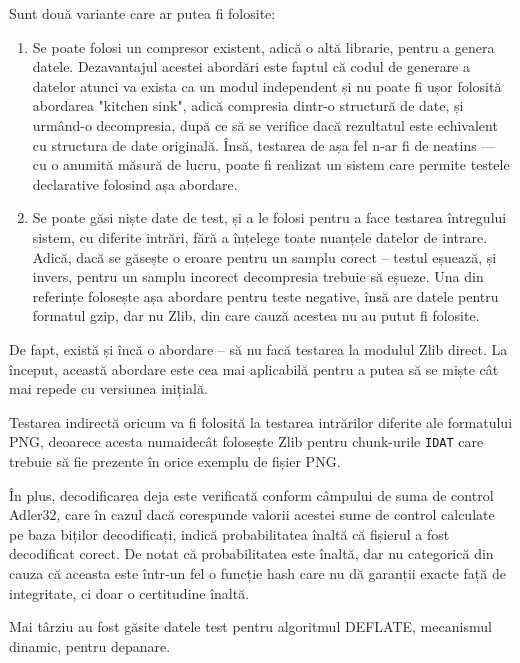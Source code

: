 \documentclass[a4paper,12pt]{report}
\begin{document}
Sunt două variante care ar putea fi folosite:
\begin{enumerate}
    \item
        Se poate folosi un compresor existent, adică o altă librarie, pentru a genera datele.
        Dezavantajul acestei abordări este faptul că codul de generare a datelor atunci va exista
        ca un modul independent și nu poate fi ușor folosită abordarea "kitchen sink", adică
        compresia dintr-o structură de date, și urmând-o decompresia, după ce să se verifice
        dacă rezultatul este echivalent cu structura de date originală.
        Însă, testarea de așa fel n-ar fi de neatins --- cu o anumită măsură de lucru,
        poate fi realizat un sistem care permite testele declarative folosind așa abordare.
    \item
        Se poate găsi niște date de test, și a le folosi pentru a face testarea
        întregului sistem, cu diferite intrări, fără a înțelege toate nuanțele datelor de intrare.
        Adică, dacă se găsește o eroare pentru un samplu corect -- testul eșuează,
        și invers, pentru un samplu incorect decompresia trebuie să eșueze.
        Una din referințe \cite{gzip_impl} folosește așa abordare pentru teste negative,
        însă are datele pentru formatul gzip, dar nu Zlib, din care cauză acestea nu au putut fi folosite.
\end{enumerate}

De fapt, există și încă o abordare -- să nu facă testarea la modulul Zlib direct.
La început, această abordare este cea mai aplicabilă pentru a putea să se miște cât mai repede cu versiunea inițială.

Testarea indirectă oricum va fi folosită la testarea intrărilor diferite ale formatului \ac{PNG},
deoarece acesta numaidecât folosește Zlib pentru chunk-urile \texttt{IDAT} care trebuie să fie prezente
în orice exemplu de fișier \ac{PNG}.

În plus, decodificarea deja este verificată conform câmpului de suma de control Adler32,
care în cazul dacă corespunde valorii acestei sume de control calculate pe baza biților decodificați,
indică probabilitatea înaltă că fișierul a fost decodificat corect. 
De notat că probabilitatea este înaltă, dar nu categorică din cauza
că aceasta este într-un fel o funcție hash care nu dă garanții
exacte față de integritate, ci doar o certitudine înaltă.

Mai târziu au fost găsite datele test pentru algoritmul DEFLATE,
mecanismul dinamic, pentru depanare\cite{deflate_tests}.
\end{document}
